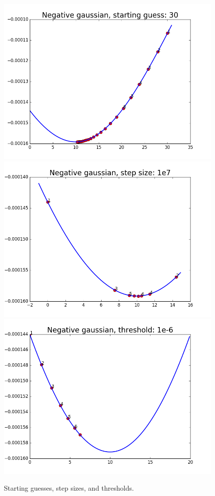 \documentclass{article}
\begin{document}
\begin{figure}[width=\linewidth]
\begin{multicols}{2}
  \includegraphics[width=1.2\linewidth]{code/P1/negative_gaussian,starting30.png}
  \includegraphics[width=1.2\linewidth]{code/P1/negative_gaussian,stepsize1e7.png}
  \includegraphics[width=1.2\linewidth]{code/P1/negative_gaussian,threshold1e-6.png}
\end{multicols}
\caption{Starting guesses, step sizes, and thresholds.}
\end{figure}
\end{document}
